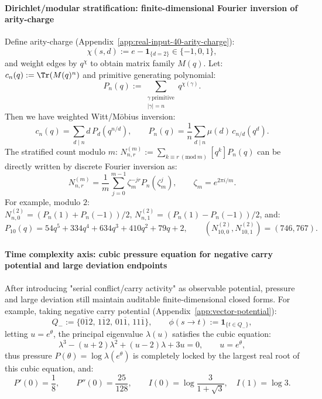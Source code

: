 \paragraph{Dirichlet/modular stratification: finite-dimensional Fourier inversion of arity-charge}
Define arity-charge (Appendix~\ref{app:real-input-40-arity-charge}):
\[
\chi(s,d):=e-\mathbf{1}_{\{d=2\}}\in\{-1,0,1\},
\]
and weight edges by $q^{\chi}$ to obtain matrix family $M(q)$.
Let:
\(
c_n(q):=\Tr(M(q)^n)
\)
and primitive generating polynomial:
\[
P_n(q):=\sum_{\substack{\gamma\ \mathrm{primitive}\\|\gamma|=n}}q^{\chi(\gamma)}.
\]
Then we have weighted Witt/Möbius inversion:
\[
c_n(q)=\sum_{d\mid n}d\,P_d\!\left(q^{n/d}\right),
\qquad
P_n(q)=\frac{1}{n}\sum_{d\mid n}\mu(d)\,c_{n/d}\!\left(q^{d}\right).
\]
The stratified count modulo $m$:
\(
N_{n,r}^{(m)}:=\sum_{k\equiv r\ (\mathrm{mod}\ m)}[q^k]P_n(q)
\)
can be directly written by discrete Fourier inversion as:
\[
\boxed{\;
N_{n,r}^{(m)}=\frac{1}{m}\sum_{j=0}^{m-1}\zeta_m^{-jr}P_n(\zeta_m^j),
\qquad \zeta_m=e^{2\pi i/m}.\;}
\]
For example, modulo $2$:
\(
N_{n,0}^{(2)}=(P_n(1)+P_n(-1))/2,\,
N_{n,1}^{(2)}=(P_n(1)-P_n(-1))/2
\),
and:
\[
P_{10}(q)=54q^5+334q^4+634q^3+410q^2+79q+2,
\qquad
(N_{10,0}^{(2)},N_{10,1}^{(2)})=(746,767).
\]

\paragraph{Time complexity axis: cubic pressure equation for negative carry potential and large deviation endpoints}
After introducing "serial conflict/carry activity" as observable potential, pressure and large deviation still maintain auditable finite-dimensional closed forms.
For example, taking negative carry potential (Appendix~\ref{app:vector-potential}):
\[
Q_-:=\{0\overline{1}2,\,1\overline{1}2,\,01\overline{1},\,11\overline{1}\},
\qquad
\phi(s\to t):=\mathbf{1}_{\{t\in Q_-\}},
\]
letting $u=e^\theta$, the principal eigenvalue $\lambda(u)$ satisfies the cubic equation:
\[
\boxed{\;
\lambda^3-(u+2)\lambda^2+(u-2)\lambda+3u=0,\qquad u=e^\theta,\;}
\]
thus pressure $P(\theta)=\log\lambda(e^\theta)$ is completely locked by the largest real root of this cubic equation, and:
\[
P'(0)=\frac18,\qquad P''(0)=\frac{25}{128},
\qquad
I(0)=\log\frac{3}{1+\sqrt3},\quad I(1)=\log 3.
\]

